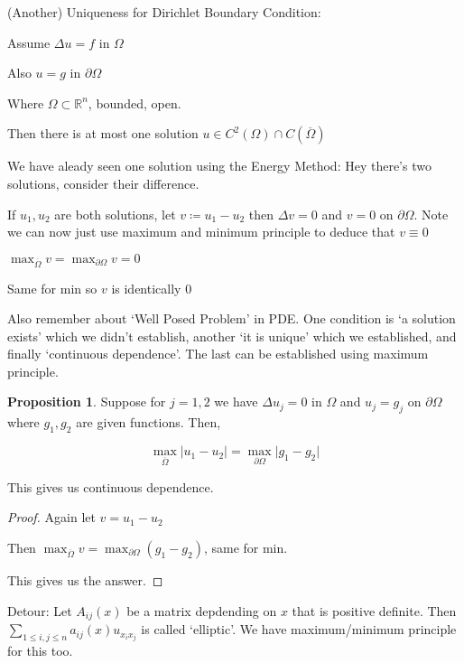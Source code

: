 \documentclass{article}
\theoremstyle{definition}
\newtheorem{proposition}{Proposition}
\begin{document}
(Another) Uniqueness for Dirichlet Boundary Condition:

Assume \(\Delta u=f\) in \(\Omega \) 

Also \(u = g\) in \(\partial \Omega \) 

Where \(\Omega \subset \mathbb{R} ^n\), bounded, open.

Then there is at most one solution \(u\in C^2(\Omega )\cap C(\overline{\Omega} )\) 

We have aleady seen one solution using the Energy Method: Hey there's two solutions, consider their difference.

If \(u_1,u_2\) are both solutions, let \(v\coloneqq u_1 - u_2 \) then \(\Delta v = 0\) and \(v=0\) on \(\partial \Omega\). Note we can now just use maximum and minimum principle to deduce that \(v\equiv 0\) 

\(\max_{\overline{\Omega} }v = \max _{\partial \Omega }v = 0\) 

Same for min so \(v\) is identically \(0\) 

Also remember about `Well Posed Problem' in PDE. One condition is `a solution exists' which we didn't establish, another `it is unique' which we established, and finally `continuous dependence'. The last can be established using maximum principle.

\begin{proposition}
    Suppose for \(j=1,2\) we have \(\Delta u_j = 0\) in \(\Omega \) and \(u_j = g_j\) on \(\partial \Omega\)  where \(g_1,g_2\) are given functions. Then,

    \[
        \max_{\overline{\Omega } }\vert u_1 - u_2 \vert = \max _{\partial \Omega}\vert g_1 - g_2 \vert 
    \]

    This gives us continuous dependence.

\end{proposition}

\begin{proof}
    Again let \(v = u_1 - u_2\) 

    Then \(\max _{\overline{\Omega }} v=\max_{\partial \Omega} (g_1 - g_2)\), same for min.
    
    This gives us the answer.

\end{proof}

Detour: Let \(A_{ij}(x)\) be a matrix depdending on \(x\) that is positive definite. Then \(\displaystyle \sum_{1\leq i,j\leq n} a_{ij}(x) u_{x_i x_j} \) is called `elliptic'. We have maximum/minimum principle for this too.
\end{document}
